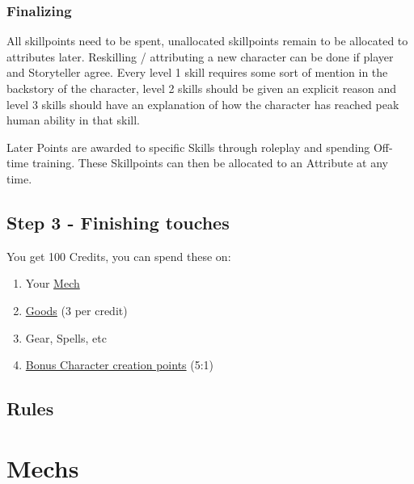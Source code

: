 \documentclass[a4paper]{book}
\begin{document}
    \subsection{Finalizing}\label{subsec:finalizing}
    All skillpoints need to be spent, unallocated skillpoints remain to be allocated to attributes later.
    Reskilling / attributing a new character can be done if player and Storyteller agree.
    Every level 1 skill requires some sort of mention in the backstory of the character, level 2 skills should be given
    an explicit reason and level 3 skills should have an explanation of how the character has reached peak human ability
    in that skill.

    Later Points are awarded to specific Skills through roleplay and spending Off-time training.
    These Skillpoints can then be allocated to an Attribute at any time.

    \section{Step 3 - Finishing touches}\label{sec:step3-finishingtouches}
    You get 100 Credits, you can spend these on:
    \begin{enumerate}[label = -]
        \item Your \hyperref[ch:mechs]{Mech}
        \item \hyperref[sec:tradegoods]{Goods} (3 per credit)
        \item Gear, Spells, etc
        \item \hyperref[sec:step2-scores]{Bonus Character creation points} (5:1)
    \end{enumerate}


    \section{Rules}\label{sec:rules}
    


    \chapter{Mechs}\label{ch:mechs}
    
\end{document}
